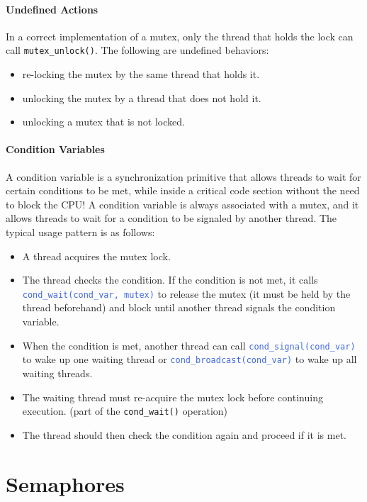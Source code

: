 \documentclass[openany,12pt]{book}
\newcommand{\code}[1]{\texttt{#1}}
\newcommand{\blue}[1]{\textcolor{RoyalBlue}{#1}}
\begin{document}
\paragraph{Undefined Actions} In a correct implementation of a mutex, only the thread that holds the lock can call \code{mutex\_unlock()}. The following are undefined behaviors:
\begin{itemize}
  \item re-locking the mutex by the same thread that holds it.
  \item unlocking the mutex by a thread that does not hold it.
  \item unlocking a mutex that is not locked.
\end{itemize}



\paragraph{Condition Variables} A condition variable is a synchronization primitive that allows threads to wait for certain conditions to be met, while inside a critical code section without the need to block the CPU!
A condition variable is always associated with a mutex, and it allows threads to wait for a condition to be signaled by another thread. The typical usage pattern is as follows:
\begin{itemize}
  \item A thread acquires the mutex lock.
  \item The thread checks the condition. If the condition is not met, it calls \blue{\code{cond\_wait(cond\_var, mutex)}} to release the mutex (it must be held by the thread beforehand) and block until another thread signals the condition variable.
  \item When the condition is met, another thread can call \blue{\code{cond\_signal(cond\_var)}} to wake up one waiting thread or \blue{\code{cond\_broadcast(cond\_var)}} to wake up all waiting threads.
  \item The waiting thread must re-acquire the mutex lock before continuing execution. (part of the \code{cond\_wait()} operation)
  \item The thread should then check the condition again and proceed if it is met.
\end{itemize}

\section*{Semaphores}
\end{document}
